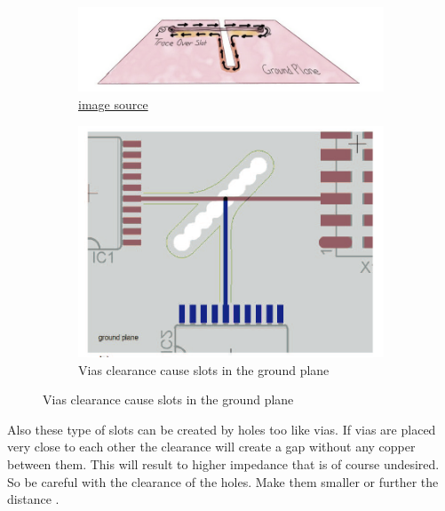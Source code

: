 \documentclass[final]{cubedoc}
\begin{document}
	\begin{figure}[h!]
		\centering
		\begin{subfigure}{.5\textwidth}
			\centering
			\includegraphics[keepaspectratio, width=\textwidth]{assets/slot.png}
			\caption{\href{https://web.archive.org/web/20200814093921/https://www.tempoautomation.com/blog/design-to-avoid-emi-problems-keep-clocks-away-from-unintended-antennas/}{image source}}
		\end{subfigure}%
		\begin{subfigure}{.5\textwidth}
			\centering	
			\includegraphics[width=\textwidth]{assets/slot_via.png}
			\caption{Vias clearance cause slots in the ground plane \cite{instruments2006high}}
		\end{subfigure}
	\end{figure}
	
	Also these type of slots can be created by holes too like vias. If vias are placed very close to each other the clearance will create a gap without any copper between them. This will result to higher impedance that is of course undesired. So be careful with the clearance of the holes. Make them smaller or further the distance \cite{instruments2006high}.
	
\end{document}

